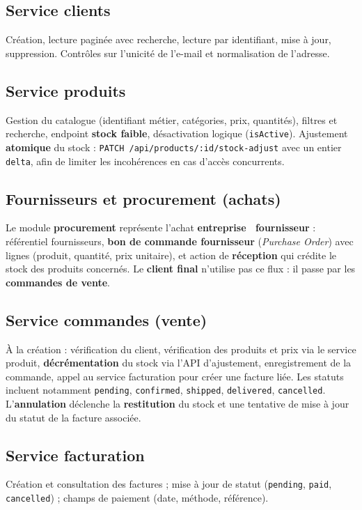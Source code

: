 \documentclass[11pt,a4paper]{article}
\begin{document}
\subsection{Service clients}
Création, lecture paginée avec recherche, lecture par identifiant, mise à jour, suppression. Contrôles sur l'unicité de l'e-mail et normalisation de l'adresse.

\subsection{Service produits}
Gestion du catalogue (identifiant métier, catégories, prix, quantités), filtres et recherche, endpoint \textbf{stock faible}, désactivation logique (\texttt{isActive}). Ajustement \textbf{atomique} du stock : \texttt{PATCH /api/products/:id/stock-adjust} avec un entier \texttt{delta}, afin de limiter les incohérences en cas d'accès concurrents.

\subsection{Fournisseurs et procurement (achats)}
Le module \textbf{procurement} représente l'achat \textbf{entreprise \textrightarrow\ fournisseur} : référentiel fournisseurs, \textbf{bon de commande fournisseur} (\emph{Purchase Order}) avec lignes (produit, quantité, prix unitaire), et action de \textbf{réception} qui crédite le stock des produits concernés. Le \textbf{client final} n'utilise pas ce flux : il passe par les \textbf{commandes de vente}.

\subsection{Service commandes (vente)}
À la création : vérification du client, vérification des produits et prix via le service produit, \textbf{décrémentation} du stock via l'API d'ajustement, enregistrement de la commande, appel au service facturation pour créer une facture liée. Les statuts incluent notamment \texttt{pending}, \texttt{confirmed}, \texttt{shipped}, \texttt{delivered}, \texttt{cancelled}. L'\textbf{annulation} déclenche la \textbf{restitution} du stock et une tentative de mise à jour du statut de la facture associée.

\subsection{Service facturation}
Création et consultation des factures ; mise à jour de statut (\texttt{pending}, \texttt{paid}, \texttt{cancelled}) ; champs de paiement (date, méthode, référence).
\end{document}
